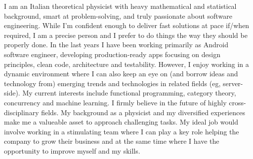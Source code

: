 
\begin{cvparagraph}
I am an Italian theoretical physicist with heavy mathematical and statistical 
background, smart at problem-solving, and truly passionate about software engineering. 
While 
I'm confident enough to
deliver 
fast solutions at pace
if/when
required, 
I am a precise person and I prefer to do things the way they
should be properly done.
In the last years I have been working primarily as Android software engineer,  developing production-ready apps 
	focusing on design principles, clean code, architecture and testability.
 However, I enjoy  working in a dynamic
environment 
 where I can also keep an eye on (and borrow ideas and technology from) emerging trends and technologies in related
	fields (eg, server-side).
	My current interests include functional programming, category theory, concurrency and machine learning. 
 I firmly
believe in the future of highly cross-disciplinary fields.
My background as a physicist and my diversified experiences make me a valueable asset to approach challenging tasks. 
My ideal job would involve working in a stimulating team where I
can play a key role helping the company to grow their business and at the same time
where I have the opportunity to improve myself and my skills.
\end{cvparagraph}

